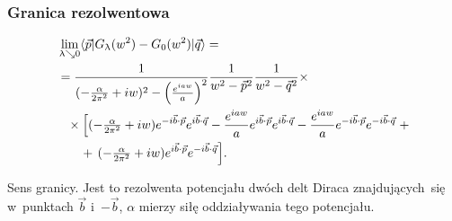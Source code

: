 \documentclass[10pt,t]{beamer}
\begin{document}
\begin{frame}
  \frametitle{Granica rezolwentowa}


  \begin{equation}
    \label{eq:Efekt-Casimira-34}
    \begin{split}
      &\lim_{ \uplambda \searrow 0 }\langle \vec{ p } | G_{ \uplambda }( w^{ 2 } ) - G_{ 0 }( w^{ 2 } )
        | \vec{ q } \rangle
        = \\
      &= \frac{ 1 }{ ( -\tfrac{ \alpha } { 2 \pi^{ 2 } } + iw )^{ 2 }
        - \left( \tfrac{ e^{ i aw } }{ a } \right)^{ 2 } }
        \frac{ 1 }{ w^{ 2 } - \vec{ p }^{ 2 } }
        \frac{ 1 }{ w^{ 2 } - \vec{ q }^{ 2 } } \times \\
      &\hphantom{=}
        \times \Big[ ( -\tfrac{ \alpha }{ 2 \pi^{ 2 } } + i w ) e^{ -i \vec{ b } \cdot \vec{ p } }
        e^{ i \vec{ b } \cdot \vec{ q } }
        - \frac{ e^{ i aw } }{ a } e^{ i \vec{ b } \cdot \vec{ p } }
        e^{ i \vec{ b } \cdot \vec{ q } } -\frac{ e^{ i aw } }{ a } e^{ -i \vec{ b } \cdot \vec{ p } }
        e^{ -i \vec{ b } \cdot \vec{ q } } \; + \\
      &\hphantom{= \times}
        + \, ( -\tfrac{ \alpha }{ 2 \pi^{ 2 } } + i w ) e^{ i \vec{ b } \cdot \vec{ p } }
        e^{ -i \vec{ b } \cdot \vec{ q } } \Big].
    \end{split}
  \end{equation}

  Sens granicy. Jest to rezolwenta potencjału dwóch delt Diraca
  znajdujących~się w~punktach $\vec{ b }$ i~$-\vec{ b }$, $\alpha$ mierzy siłę
  oddziaływania tego potencjału.

\end{frame}
\end{document}
